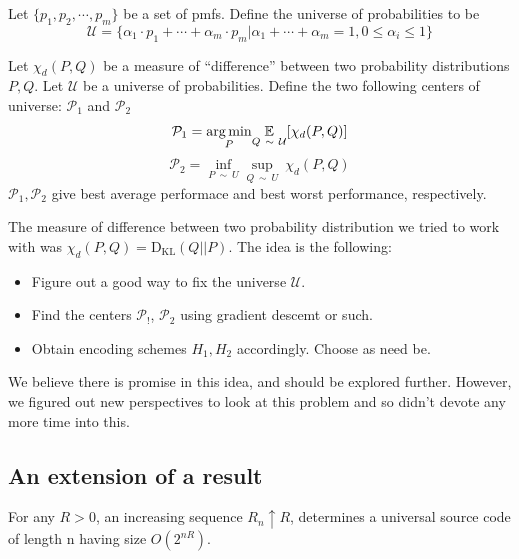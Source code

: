 \documentclass[scrartcl]{article}
\begin{document}
\begin{proposition*}
    Let $\{p_1, p_2, \cdots, p_m\}$ be a set of pmfs. Define the universe of probabilities to be
    $$\mathcal{U} = \Bigg\{\alpha_1 \cdot p_1 + \cdots + \alpha_m \cdot p_m \Bigg| \alpha_1 + \cdots + \alpha_m = 1, 0 \leq \alpha_i \leq 1\Bigg\}$$
\end{proposition*}
\begin{proposition*}
    Let $\chi_d(P,Q)$ be a measure of ``difference'' between two probability distributions $P, Q$. Let $\mathcal{U}$ be a universe of probabilities. Define the two following centers of universe: $\mathcal{P}_{1}$ and $\mathcal{P}_{2}$
    $$\mathcal{P}_1 = \underset{P}{\arg \min} \underset{Q \ \sim \ \mathcal{U}}{\Bbb{E}}[\chi_d(P,Q)]$$
    $$\mathcal{P}_2 = \underset{P \ \sim \ U}{\inf} \underset{Q \ \sim \ U}{\sup} \ \chi_d(P,Q)$$
    $\mathcal{P}_1, \mathcal{P}_2$ give best average performace and best worst performance, respectively.
\end{proposition*}

The measure of difference between two probability distribution we tried to work with was $\chi_d(P,Q) = \operatorname{D_{KL}}(Q || P)$.
The idea is the following:
\begin{itemize}
    \item Figure out a good way to fix the universe $\mathcal{U}$. 
    \item Find the centers $\mathcal{P}_!$, $\mathcal{P}_2$ using gradient descemt or such.
    \item Obtain encoding schemes $H_1, H_2$ accordingly. Choose as need be. 
\end{itemize}
We believe there is promise in this idea, and should be explored further. However, we figured out new perspectives to look at this problem and so didn't devote any more time into this.
\subsection{An extension of a result}
\begin{theorem*}
For any $R>0$, an increasing sequence $R_n \uparrow R$, determines a universal source code of length n having size $O(2^{nR})$.
\end{theorem*}
\end{document}
